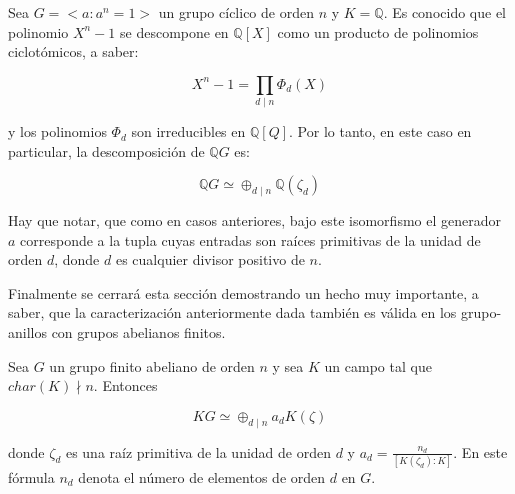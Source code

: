 \begin{ejemplo}\label{ejem:descomposicionRacional}
Sea $G = < a \colon a^n = 1 >$  un grupo cíclico de orden $n$ y $K = \mathds{Q} $. Es conocido que el polinomio $X^n-1$ se descompone en $\mathds{Q}[X]$ como un producto de polinomios ciclotómicos, a saber:

\[ X^n -1 = \prod_{d \mid n}\Phi_d(X)  \]

y los polinomios $\Phi_d$ son irreducibles en $\mathds{Q}[Q]$. Por lo tanto, en este caso en particular, la descomposición de $\mathds{Q}G$ es:

\[ \mathds{Q}G \simeq \oplus_{d\mid n} \mathds{Q}(\zeta_d)  \]

Hay que notar, que como en casos anteriores, bajo este isomorfismo el generador $a$ corresponde a la tupla cuyas entradas son raíces primitivas de la unidad de orden $d$, donde $d$ es cualquier divisor positivo de $n$. 
\end{ejemplo}

Finalmente se cerrará esta sección demostrando un hecho muy importante, a saber, que la caracterización anteriormente dada  también es válida en los grupo-anillos con grupos  abelianos finitos.

\begin{teorema}\label{teo:Perlis-Walker}
Sea $G$ un grupo finito abeliano de orden $n$ y sea $K$ un campo tal que $char(K)\nmid n$. Entonces

\[  KG \simeq \oplus_{d\mid n}a_dK(\zeta) \]

donde $\zeta_d$ es una raíz primitiva de la unidad de orden $d$ y $a_d = \frac{n_d}{[K(\zeta_d):K]}$. En este fórmula $n_d$ denota el número de elementos de orden $d$ en $G$.
\end{teorema} 

